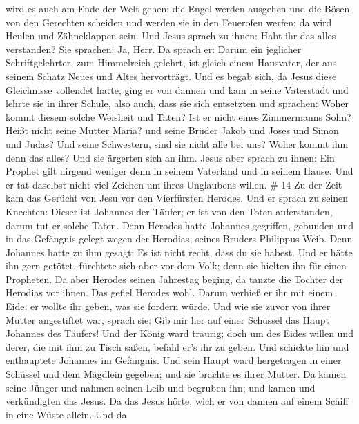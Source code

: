 wird es auch am Ende der Welt gehen: die Engel werden ausgehen und die
Bösen von den Gerechten scheiden  und werden sie in den
Feuerofen werfen; da wird Heulen und Zähneklappen sein. 
Und Jesus sprach zu ihnen: Habt ihr das alles verstanden? Sie sprachen:
Ja, Herr.  Da sprach er: Darum ein jeglicher
Schriftgelehrter, zum Himmelreich gelehrt, ist gleich einem Hausvater,
der aus seinem Schatz Neues und Altes hervorträgt.  Und es
begab sich, da Jesus diese Gleichnisse vollendet hatte, ging er von
dannen  und kam in seine Vaterstadt und lehrte sie in ihrer
Schule, also auch, dass sie sich entsetzten und sprachen: Woher kommt
diesem solche Weisheit und Taten?  Ist er nicht eines
Zimmermanns Sohn? Heißt nicht seine Mutter Maria? und seine Brüder Jakob
und Joses und Simon und Judas?  Und seine Schwestern, sind
sie nicht alle bei uns? Woher kommt ihm denn das alles? 
Und sie ärgerten sich an ihm. Jesus aber sprach zu ihnen: Ein Prophet
gilt nirgend weniger denn in seinem Vaterland und in seinem Hause.
 Und er tat daselbst nicht viel Zeichen um ihres Unglaubens
willen. \# 14  Zu der Zeit kam das Gerücht von Jesu vor den
Vierfürsten Herodes.  Und er sprach zu seinen Knechten:
Dieser ist Johannes der Täufer; er ist von den Toten auferstanden, darum
tut er solche Taten.  Denn Herodes hatte Johannes gegriffen,
gebunden und in das Gefängnis gelegt wegen der Herodias, seines Bruders
Philippus Weib.  Denn Johannes hatte zu ihm gesagt: Es ist
nicht recht, dass du sie habest.  Und er hätte ihn gern
getötet, fürchtete sich aber vor dem Volk; denn sie hielten ihn für
einen Propheten.  Da aber Herodes seinen Jahrestag beging,
da tanzte die Tochter der Herodias vor ihnen. Das gefiel Herodes wohl.
 Darum verhieß er ihr mit einem Eide, er wollte ihr geben,
was sie fordern würde.  Und wie sie zuvor von ihrer Mutter
angestiftet war, sprach sie: Gib mir her auf einer Schüssel das Haupt
Johannes des Täufers!  Und der König ward traurig; doch um
des Eides willen und derer, die mit ihm zu Tisch saßen, befahl er's ihr
zu geben.  Und schickte hin und enthauptete Johannes im
Gefängnis.  Und sein Haupt ward hergetragen in einer
Schüssel und dem Mägdlein gegeben; und sie brachte es ihrer Mutter.
 Da kamen seine Jünger und nahmen seinen Leib und begruben
ihn; und kamen und verkündigten das Jesus.  Da das Jesus
hörte, wich er von dannen auf einem Schiff in eine Wüste allein. Und da

